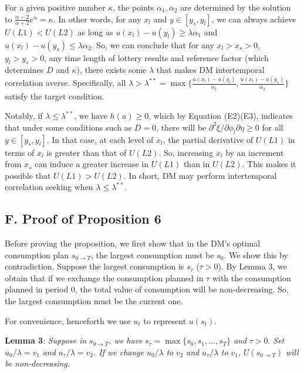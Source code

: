 For a given positive number \(\kappa\), the points \(\alpha_1,\alpha_2\)
are determined by the solution to
\(\frac{\alpha-2}{\alpha+2}e^{\alpha}=\kappa\). In other words, for any
\(x_l\) and \(y\in[y_s,y_l]\), we can always achieve \(U(L1)<U(L2)\) as
long as \(u(x_l)-u(y_l)\geq \lambda\alpha_1\) and
\(u(x_l)-u(y_s)\leq\lambda\alpha_2\). So, we can conclude that for any
\(x_l>x_s>0\), \(y_l>y_s>0\), any time length of lottery results and
reference factor (which determines \(D\) and \(\kappa\)), there exists
some \(\lambda\) that makes DM intertemporal correlation averse.
Specifically, all
\(\lambda>\lambda^{**} ={\max}\{\frac{u(x_l)-u(y_l)}{\alpha_1},\frac{u(x_l)-u(y_s)}{\alpha_2}\}\)
satisfy the target condition.

Notably, if \(\lambda\leq\lambda^{**}\), we have \(h(a)\geq0\), which by
Equation (E2)(E3), indicates that under some conditions such as \(D=0\),
there will be \(\partial^2 \xi/\partial \phi_l\partial \eta\geq0\) for
all \(y\in[y_s,y_l]\). In that case, at each level of \(x_l\), the
partial derivative of \(U(L1)\) in terms of \(x_l\) is greater than that
of \(U(L2)\). So, increasing \(x_l\) by an increment from \(x_s\) can
induce a greater increase in \(U(L1)\) than in \(U(L2)\). This makes it
possible that \(U(L1)>U(L2)\). In short, DM may perform intertemporal
correlation seeking when \(\lambda\leq\lambda^{**}\).

\hypertarget{f.-proof-of-proposition-6}{%
\subsection*{F. Proof of Proposition
6}\label{f.-proof-of-proposition-6}}

Before proving the proposition, we first show that in the DM's optimal
consumption plan \(s_{0\rightarrow T}\), the largest consumption must be
\(s_0\). We show this by contradiction. Suppose the largest consumption
is \(s_\tau\) (\(\tau>0\)). By Lemma 3, we obtain that if we exchange
the consumption planned in \(\tau\) with the consumption planned in
period 0, the total value of consumption will be non-decreasing. So, the
largest consumption must be the current one.

For convenience, henceforth we use \(u_t\) to represent \(u(s_t)\).

\noindent \textbf{Lemma 3}: \emph{Suppose in}
\(s_{0\rightarrow T}\)\emph{, we have}
\(s_\tau= \max\{s_0,s_1,...,s_T\}\) \emph{and} \(\tau>0\). \emph{Set}
\(u_0/\lambda=v_1\) \emph{and} \(u_{\tau}/\lambda=v_2\)\emph{. If we
change} \(u_0/\lambda\) \emph{to} \(v_2\) \emph{and}
\(u_{\tau}/\lambda\) \emph{to} \(v_1\)\emph{,} \(U(s_{0\rightarrow T})\)
\emph{will be non-decreasing.}

